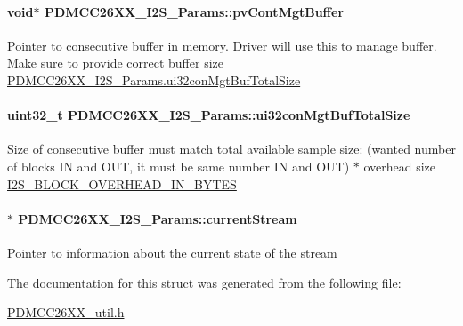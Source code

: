\paragraph[{pv\+Cont\+Mgt\+Buffer}]{\setlength{\rightskip}{0pt plus 5cm}void$\ast$ P\+D\+M\+C\+C26\+X\+X\+\_\+\+I2\+S\+\_\+\+Params\+::pv\+Cont\+Mgt\+Buffer}\label{struct_p_d_m_c_c26_x_x___i2_s___params_ac8f783b111a55c3297e970504612e05a}
Pointer to consecutive buffer in memory. Driver will use this to manage buffer. Make sure to provide correct buffer size \hyperlink{struct_p_d_m_c_c26_x_x___i2_s___params_aac40d4e38985144bfe1bddc9b42ac04a}{P\+D\+M\+C\+C26\+X\+X\+\_\+\+I2\+S\+\_\+\+Params.\+ui32con\+Mgt\+Buf\+Total\+Size} 
\paragraph[{ui32con\+Mgt\+Buf\+Total\+Size}]{\setlength{\rightskip}{0pt plus 5cm}uint32\+\_\+t P\+D\+M\+C\+C26\+X\+X\+\_\+\+I2\+S\+\_\+\+Params\+::ui32con\+Mgt\+Buf\+Total\+Size}\label{struct_p_d_m_c_c26_x_x___i2_s___params_aac40d4e38985144bfe1bddc9b42ac04a}
Size of consecutive buffer must match total available sample size\+: (wanted number of blocks I\+N and O\+U\+T, it must be same number I\+N and O\+U\+T) $\ast$ overhead size \hyperlink{_p_d_m_c_c26_x_x__util_8h_a8b3b29f28fba7618e60409457a14f6f8}{I2\+S\+\_\+\+B\+L\+O\+C\+K\+\_\+\+O\+V\+E\+R\+H\+E\+A\+D\+\_\+\+I\+N\+\_\+\+B\+Y\+T\+E\+S} 
\paragraph[{current\+Stream}]{$\ast$ P\+D\+M\+C\+C26\+X\+X\+\_\+\+I2\+S\+\_\+\+Params\+::current\+Stream}\label{struct_p_d_m_c_c26_x_x___i2_s___params_aaabb96f9076a3e32f28c22164ab32159}
Pointer to information about the current state of the stream 

The documentation for this struct was generated from the following file\+:\begin{DoxyCompactItemize}
\item 
\hyperlink{_p_d_m_c_c26_x_x__util_8h}{P\+D\+M\+C\+C26\+X\+X\+\_\+util.\+h}\end{DoxyCompactItemize}
